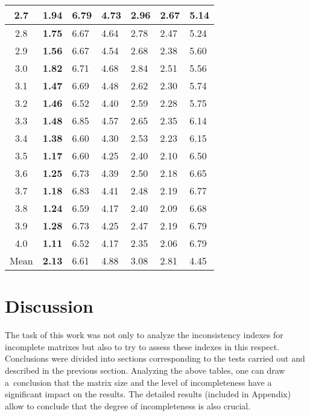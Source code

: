 \begin{table}[!ht]
\begin{center}
\begin{tabular}{|c||llllll|}
2.7 & \textbf{1.94} & 6.79 & 4.73 & 2.96 & 2.67 & 5.14 \\ \hline
2.8 & \textbf{1.75} & 6.67 & 4.64 & 2.78 & 2.47 & 5.24 \\ \hline
2.9 & \textbf{1.56} & 6.67 & 4.54 & 2.68 & 2.38 & 5.60 \\ \hline
3.0 & \textbf{1.82} & 6.71 & 4.68 & 2.84 & 2.51 & 5.56 \\ \hline
3.1 & \textbf{1.47} & 6.69 & 4.48 & 2.62 & 2.30 & 5.74 \\ \hline
3.2 & \textbf{1.46} & 6.52 & 4.40 & 2.59 & 2.28 & 5.75 \\ \hline
3.3 & \textbf{1.48} & 6.85 & 4.57 & 2.65 & 2.35 & 6.14 \\ \hline
3.4 & \textbf{1.38} & 6.60 & 4.30 & 2.53 & 2.23 & 6.15 \\ \hline
3.5 & \textbf{1.17} & 6.60 & 4.25 & 2.40 & 2.10 & 6.50 \\ \hline
3.6 & \textbf{1.25} & 6.73 & 4.39 & 2.50 & 2.18 & 6.65 \\ \hline
3.7 & \textbf{1.18} & 6.83 & 4.41 & 2.48 & 2.19 & 6.77 \\ \hline
3.8 & \textbf{1.24} & 6.59 & 4.17 & 2.40 & 2.09 & 6.68 \\ \hline
3.9 & \textbf{1.28} & 6.73 & 4.25 & 2.47 & 2.19 & 6.79 \\ \hline
4.0 & \textbf{1.11} & 6.52 & 4.17 & 2.35 & 2.06 & 6.79 \\ \hline \hline
Mean & \textbf{2.13} & 6.61 & 4.88 & 3.08 & 2.81 & 4.45 \\ \hline 
\end{tabular}
\end{center}
\end{table}

\section{Discussion}
The task of this work was not only to analyze the inconsistency indexes for incomplete matrixes but also to try to assess these indexes in this respect. Conclusions were divided into sections corresponding to the tests carried out and described in the previous section. Analyzing the above tables, one can draw a~conclusion that the matrix size and the level of incompleteness have a significant impact on the results. The detailed results (included in Appendix) allow to conclude that the degree of incompleteness is also crucial.

\newpage
